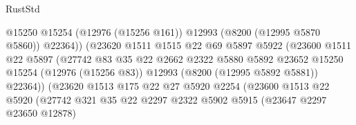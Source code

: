 \begin{lexlean}{RustStd}
\begin{coremodule}
                                          @15250
                                          @15254
                                          (@12976 (@15256 @161))
                                          @12993
                                          (@8200 (@12995 @5870 @5860))
                                          @22364))
                                      (@23620
                                        @1511
                                        @1515
                                        @22
                                        @69
                                        @5897
                                        @5922
                                        (@23600
                                          @1511
                                          @22
                                          @5897
                                          (@27742
                                            @83
                                            @35
                                            @22
                                            @2662
                                            @2322
                                            @5880
                                            @5892
                                            @23652
                                            @15250
                                            @15254
                                            (@12976 (@15256 @83))
                                            @12993
                                            (@8200 (@12995 @5892 @5881))
                                            @22364))
                                        (@23620
                                          @1513
                                          @175
                                          @22
                                          @27
                                          @5920
                                          @2254
                                          (@23600
                                            @1513
                                            @22
                                            @5920
                                            (@27742
                                              @321
                                              @35
                                              @22
                                              @2297
                                              @2322
                                              @5902
                                              @5915
                                              (@23647 @2297 @23650 @12878)

\end{coremodule}
\end{lexlean}
